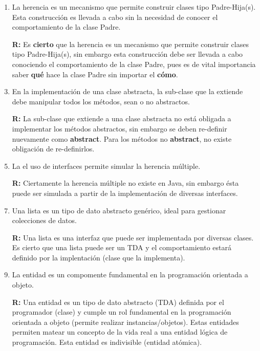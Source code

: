 \documentclass[10pt]{article}
\begin{document}
{\begin{enumerate}
        \begin{enumerate}[label=(\alph*)]
            \item La herencia es un mecanismo que permite construir clases tipo Padre-Hija(s). Esta construcci\'on es llevada a cabo sin la necesidad de conocer el comportamiento de la clase Padre.
            \item[\textbf{R:}] Es \textbf{cierto} que la herencia es un mecanismo que permite construir clases tipo Padre-Hija(s), sin embargo esta construcci\'on debe ser llevada a cabo conociendo el comportamiento de la clase Padre, pues es de vital importancia saber \textbf{qu\'e} hace la clase Padre sin importar el \textbf{c\'omo}.
            \item En la implementaci\'on de una clase abstracta, la sub-clase que la extiende debe manipular todos los m\'etodos, sean o no abstractos.
            \item[\textbf{R:}] La sub-clase que extiende a una clase abstracta no est\'a obligada a implementar los m\'etodos abstractos, sin embargo se deben re-definir nuevamente como \textbf{abstract}. Para los m\'etodos no \textbf{abstract}, no existe obligaci\'on de re-definirlos.
            \item La el uso de interfaces permite simular la herencia m\'ultiple. 
            \item[\textbf{R:}] Ciertamente la herencia m\'ultiple no existe en Java, sin embargo \'esta puede ser simulada a partir de la implementaci\'on de diversas interfaces.
            \item Una lista es un tipo de dato abstracto gen\'erico, ideal para gestionar colecciones de datos.
            \item[\textbf{R:}] Una lista es una interfaz que puede ser implementada por diversas clases. Es cierto que una lista puede ser un TDA y el comportamiento estar\'a definido por la implentaci\'on (clase que la implementa).
            \item La entidad es un compomente fundamental en la programaci\'on orientada a objeto.
            \item[\textbf{R:}] Una entidad es un tipo de dato abstracto (TDA) definida por el programador (clase) y cumple un rol fundamental en la programación orientada a objeto (permite realizar instancias/objetos). Estas entidades permiten matear un concepto de la vida real a una entidad l\'ogica de programaci\'on. Esta entidad es indivisible (entidad at\'omica).
        \end{enumerate}
\newpage

\end{enumerate}}
\end{document}
